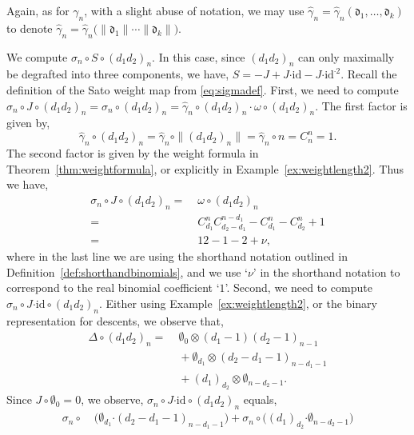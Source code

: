 \documentclass[5p,twocolumn]{elsarticle}
\newcommand*{\id}{{\mathrm{id}}}
\newcommand*{\df}{\mathfrak d}
\newcommand*{\cendot}{\boldsymbol{\cdot}}
\begin{document}
Again, as for $\gamma_n$, with a slight abuse of notation, we may use $\hat{\gamma}_n=\hat{\gamma}_n(\df_1,\ldots,\df_k)$ to denote $\hat{\gamma}_n=\hat{\gamma}_n\bigl(\|\df_1\|\cdots\|\df_k\|\bigr)$.
%
\begin{example}\label{ex:main2}
  We compute $\sigma_n\circ S\circ (d_1d_2)_n$. In this case, since $(d_1d_2)_n$ can only maximally be degrafted into three components,
  we have, $S=-J+J\cendot\id-J\cendot\id^{\cendot2}$. Recall the definition of the Sato weight map from \eqref{eq:sigmadef}. 
  First, we need to compute $\sigma_n\circ J\circ (d_1d_2)_n=\sigma_n\circ(d_1d_2)_n=\hat{\gamma}_n\circ(d_1d_2)_n\cdot\omega\circ(d_1d_2)_n$.
  The first factor is given by,
  \begin{equation*}
  \hat{\gamma}_n\circ(d_1d_2)_n=\hat{\gamma}_n\circ\|(d_1d_2)_n\|=\hat{\gamma}_n\circ n=C_n^n=1.
  \end{equation*}
  The second factor is given by the weight formula in Theorem~\ref{thm:weightformula}, or explicitly in Example~\ref{ex:weightlength2}.
  Thus we have,
  \begin{align*}
    \sigma_n\circ J\circ (d_1d_2)_n=&\;\omega\circ (d_1d_2)_n\\
                                  =&\;C_{d_1}^{n}C^{n-d_1}_{d_2-d_1}\!-C^n_{d_1}\!-C^n_{d_2}+1\\
                                  =&\;12-1-2+\nu,
  \end{align*}
  where in the last line we are using the shorthand notation outlined in Definition~\ref{def:shorthandbinomials}, and we use `$\nu$' in the shorthand notation to correspond to the real binomial coefficient `$1$'.
  Second, we need to compute $\sigma_n\circ J\cendot\id\circ (d_1d_2)_n$. Either using Example~\ref{ex:weightlength2}, or the binary representation for descents,
  we observe that,
  \begin{align*}
    \Delta\circ(d_1d_2)_n=&\;\emptyset_0\otimes(d_1-1)(d_2-1)_{n-1}\\
                               &\;+\emptyset_{d_1}\otimes(d_2-d_1-1)_{n-d_1-1}\\
                               &\;+(d_1)_{d_2}\otimes\emptyset_{n-d_2-1}.
  \end{align*}
  Since $J\circ\emptyset_0=0$, we observe, $\sigma_n\circ J\cendot\id\circ(d_1d_2)_n$ equals,
  \begin{align*}
    \sigma_n\circ&\;\bigl(\emptyset_{d_1}\cendot(d_2-d_1-1)_{n-d_1-1}\bigr)+\sigma_n\circ\bigl((d_1)_{d_2}\cendot\emptyset_{n-d_2-1}\bigr)\\

\end{align*}
\end{example}
\end{document}
